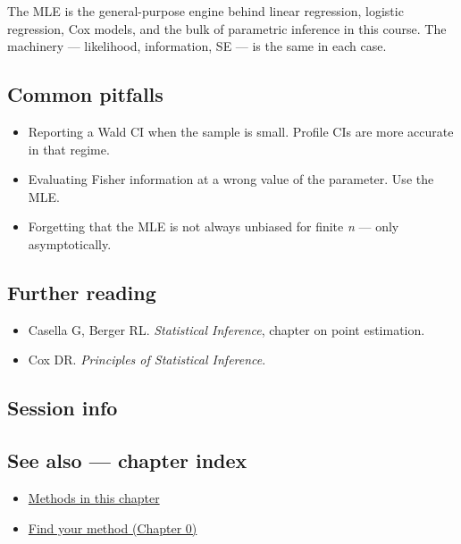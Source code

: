 \documentclass[
]{article}
\newenvironment{Shaded}{\begin{snugshade}}{\end{snugshade}}
\providecommand{\tightlist}{%
  \setlength{\itemsep}{0pt}\setlength{\parskip}{0pt}}
\begin{document}
The MLE is the general-purpose engine behind linear regression, logistic
regression, Cox models, and the bulk of parametric inference in this
course. The machinery --- likelihood, information, SE --- is the same in
each case.

\subsection{Common pitfalls}\label{common-pitfalls}

\begin{itemize}
\tightlist
\item
  Reporting a Wald CI when the sample is small. Profile CIs are more
  accurate in that regime.
\item
  Evaluating Fisher information at a wrong value of the parameter. Use
  the MLE.
\item
  Forgetting that the MLE is not always unbiased for finite \emph{n} ---
  only asymptotically.
\end{itemize}

\subsection{Further reading}\label{further-reading}

\begin{itemize}
\tightlist
\item
  Casella G, Berger RL. \emph{Statistical Inference}, chapter on point
  estimation.
\item
  Cox DR. \emph{Principles of Statistical Inference}.
\end{itemize}

\subsection{Session info}\label{session-info}

\begin{Shaded}
\begin{Highlighting}[]

\end{Highlighting}
\end{Shaded}

\subsection{See also --- chapter index}\label{see-also-chapter-index}

\begin{itemize}
\tightlist
\item
  \href{../index.Rmd}{Methods in this chapter}
\item
  \href{../../../ch00-find-your-method.Rmd}{Find your method (Chapter
  0)}
\end{itemize}
\end{document}

